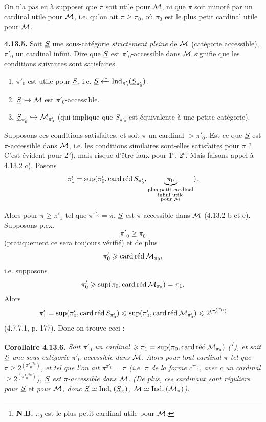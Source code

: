 On n'a pas eu à supposer que $\pi$ soit utile pour $\M$, ni que $\pi$ soit minoré par un cardinal utile pour $\M$, i.e. qu'on ait $\pi \geqslant \pi_0$, où $\pi_0$ est le plus petit cardinal utile pour $\M$.

\textbf{4.13.5.} Soit $\uS$ une sous-catégorie \textit{strictement pleine} de $\M$ (catégorie accessible), $\pi'_0$ un cardinal infini. Dire que $\uS$ est $\pi'_0$-accessible dans $\M$ signifie que les conditions suivantes sont satisfaites.
\begin{enumerate}
\item[1)] $\pi'_0$ est utile pour $\uS$, i.e. $\uS \xleftarrow{\sim} \Ind_{\pi'_0}(\uS_{\pi'_0})$.
\item[2)] $\uS \hookrightarrow \M$ est $\pi'_0$-accessible.
\item[3)] $\uS_{\pi'_0} \hookrightarrow \M_{\pi'_0}$ (qui implique que $S_{\pi'_0}$ est équivalente à une petite catégorie).
\end{enumerate}
Supposons ces conditions satisfaites, et soit $\pi$ un cardinal $> \pi'_0$. Est-ce que $\uS$ est $\pi$-accessible dans $\M$, i.e. les conditions similaires sont-elles satisfaites pour $\pi$ ? C'est évident pour 2°), mais risque d'être faux pour 1°, 2°. Mais faisons appel à 4.13.2 c). Posons
\[
\pi'_1 = \sup(\pi'_0, \card\red S_{\pi'_0}, \underbrace{\pi_0}_{\substack{\text{plus petit cardinal}\\ \text{infini utile}\\ \text{pour } \M}} ) .
\]

Alors pour $\pi \geqslant \pi'_1$ tel que $\pi^{\pi'_0} = \pi$, $\uS$ est $\pi$-accessible dans $\M$ (4.13.2 b et c). Supposons p.ex.
\[
\pi'_0 \geqslant \pi_0
\]
(pratiquement ce sera toujours vérifié) et de plus
\[
\pi'_0 \geqslant \card\red\M_{\pi_0} ,
\]
i.e. supposons
\[
\pi'_0 \geqslant \sup(\pi_0, \card\red\M_{\pi_0}) = \pi_1 .
\]
Alors
\[
\pi'_1 = \sup(\pi'_0, \card\red S_{\pi'_0}) \leqslant \sup(\pi'_0, \card\red\M_{\pi'_0}) \leqslant 2^{({\pi'_0}^{\pi_0})}
\]
(4.7.7.1, p. 177). Donc on trouve ceci :

\textbf{Corollaire 4.13.6.} \textit{Soit $\pi'_0$ un cardinal $\geqslant \pi_1 = \sup(\pi_0, \card\red\M_{\pi_0})$ (\footnote[118]{\textbf{N.B.} $\pi_0$ est le plus petit cardinal utile pour $\M$.}), et soit $\uS$ une sous-catégorie $\pi'_0$-accessible dans $\M$. Alors pour tout cardinal $\pi$ tel que $\pi \geqslant 2^{({\pi'_0}^{\pi_0})}$, et tel que l'on ait $\pi^{\pi'_0} = \pi$ (i.e. $\pi$ de la forme $c^{\pi'_0}$, avec $c$ un cardinal $\geqslant 2^{({\pi'_0}^{\pi_0})}$), $\uS$ est $\pi$-accessible dans $\M$. (De plus, ces cardinaux sont réguliers pour $\uS$} et \textit{pour $\M$, donc $\uS \simeq \Ind_\pi(\uS_\pi)$, $\M \simeq \Ind_\pi(\M_\pi)$).}

